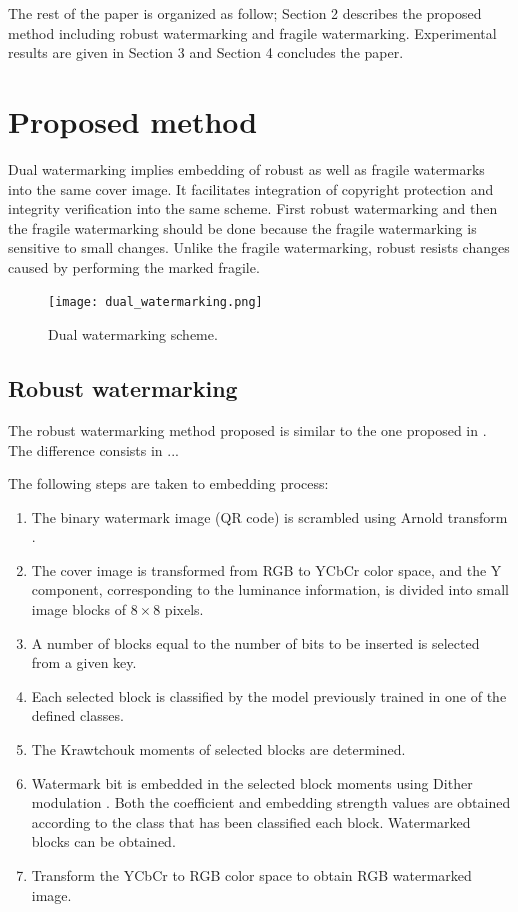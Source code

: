 \documentclass[runningheads]{llncs}
\begin{document}
The rest of the paper is organized as follow; Section 2 describes the proposed method including robust watermarking and fragile watermarking. Experimental results are given in Section 3 and Section 4 concludes the paper.

\section{Proposed method}
Dual watermarking implies embedding of robust as well as fragile watermarks into the same cover image. It facilitates integration of copyright protection and integrity verification into the same scheme. First robust watermarking and then the fragile watermarking should be done because the fragile watermarking is sensitive to small changes. Unlike the fragile watermarking, robust resists changes caused by performing the marked fragile.
\begin{figure}
	\begin{center}
		\texttt{[image: dual\_watermarking.png]}
		\caption{Dual watermarking scheme.} \label{dual_watermarking}
	\end{center}
\end{figure}

\subsection{Robust watermarking}
The robust watermarking method proposed is similar to the one proposed in \cite{avila2018watermarking}. The difference consists in ...

The following steps are taken to embedding process:
\begin{enumerate}
	\item The binary watermark image (QR code) is scrambled using Arnold transform \cite{Arnol'd:1987366}.
	\item The cover image is transformed from RGB to YCbCr color space, and the Y component, corresponding to the luminance information, is divided into small image blocks of $8\times 8$ pixels.
	\item A number of blocks equal to the number of bits to be inserted is selected from a given key.
	\item Each selected block is classified by the model previously trained in one of the defined classes.
	\item The Krawtchouk moments \cite{Yap2003} of selected blocks are determined.
	\item Watermark bit is embedded in the selected block moments using Dither modulation \cite{chen2001quantization}. Both the coefficient and embedding strength values are obtained according to the class that has been classified each block. Watermarked blocks can be obtained. 
	\item Transform the YCbCr to RGB color space to obtain RGB watermarked image.
\end{enumerate}
\end{document}
